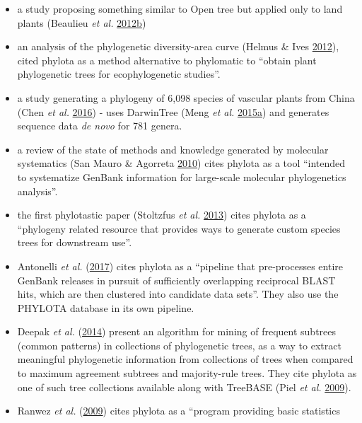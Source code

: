 \documentclass[]{article}
\begin{document}
\begin{enumerate}
\begin{itemize}
  \item
    a study proposing something similar to Open tree but applied only to land plants (Beaulieu \emph{et al.} \protect\hyperlink{ref-beaulieu2012synthesizing}{2012}\protect\hyperlink{ref-beaulieu2012synthesizing}{b})
  \item
    an analysis of the phylogenetic diversity-area curve (Helmus \& Ives \protect\hyperlink{ref-helmus2012phylogenetic}{2012}),
    cited phylota as a method alternative to phylomatic to ``obtain plant phylogenetic
    trees for ecophylogenetic studies''.
  \item
    a study generating a phylogeny of 6,098 species of vascular plants from China
    (Chen \emph{et al.} \protect\hyperlink{ref-chen2016tree}{2016}) - uses DarwinTree (Meng \emph{et al.} \protect\hyperlink{ref-meng2015darwintree}{2015}\protect\hyperlink{ref-meng2015darwintree}{a}) and generates sequence
    data \emph{de novo} for 781 genera.
  \item
    a review of the state of methods and knowledge generated by molecular systematics
    (San Mauro \& Agorreta \protect\hyperlink{ref-san2010molecular}{2010}) cites phylota as a tool ``intended to systematize GenBank information
    for large-scale molecular phylogenetics analysis''.
  \item
    the first phylotastic paper (Stoltzfus \emph{et al.} \protect\hyperlink{ref-stoltzfus2013phylotastic}{2013}) cites phylota as a ``phylogeny
    related resource that provides ways to generate custom species trees for downstream use''.
  \item
    Antonelli \emph{et al.} (\protect\hyperlink{ref-antonelli2017toward}{2017}) cites phylota as a ``pipeline that pre-processes entire GenBank
    releases in pursuit of sufficiently overlapping reciprocal BLAST hits, which are
    then clustered into candidate data sets''. They also use the PHYLOTA database in its
    own pipeline.
  \item
    Deepak \emph{et al.} (\protect\hyperlink{ref-deepak2014evominer}{2014}) present an algorithm for mining of frequent subtrees (common patterns)
    in collections of phylogenetic trees, as a way to extract meaningful phylogenetic
    information from collections of trees when compared to maximum agreement subtrees
    and majority-rule trees. They cite phylota as one of such tree collections available
    along with TreeBASE (Piel \emph{et al.} \protect\hyperlink{ref-piel2009treebase}{2009}).
  \item
    Ranwez \emph{et al.} (\protect\hyperlink{ref-ranwez2009phyloexplorer}{2009}) cites phylota as a ``program providing basic statistics

\end{itemize}
\end{enumerate}
\end{document}
